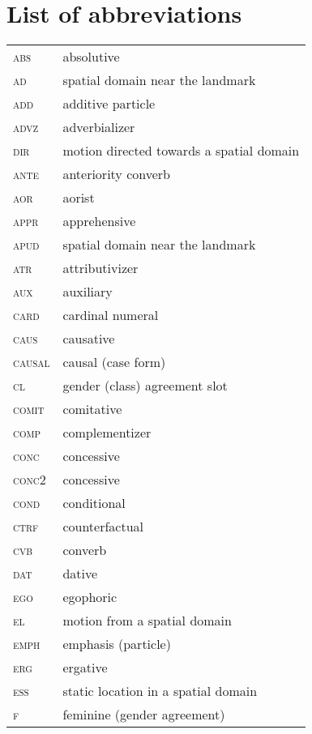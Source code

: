 ﻿\section*{List of abbreviations}


\begin{longtable}{@{}ll@{}}
\textsc{abs}	& absolutive \\
\textsc{ad}	& spatial domain near the landmark \\
\textsc{add}	& additive particle \\
\textsc{advz}	& adverbializer \\
\textsc{dir}	& motion directed towards a spatial domain \\
\textsc{ante}	& anteriority converb \\
\textsc{aor}	& aorist \\
\textsc{appr}	& apprehensive \\
\textsc{apud}	& spatial domain near the landmark \\
\textsc{atr}	& attributivizer \\
\textsc{aux}	& auxiliary \\
\textsc{card}	& cardinal numeral \\
\textsc{caus}	& causative \\
\textsc{causal}	& causal (case form) \\
\textsc{cl}	& gender (class) agreement slot \\
\textsc{comit}	& comitative \\
\textsc{comp}	& complementizer \\
\textsc{conc}	& concessive \\
\textsc{conc2}	& concessive \\
\textsc{cond}	& conditional \\
\textsc{ctrf}	& counterfactual \\
\textsc{cvb}	& converb \\
\textsc{dat}	& dative \\
\textsc{ego}	& egophoric \\
\textsc{el}	& motion from a spatial domain \\
\textsc{emph}	& emphasis (particle) \\
\textsc{erg}	& ergative \\
\textsc{ess}	& static location in a spatial domain \\
\textsc{f}	& feminine (gender agreement) \\

\end{longtable}
